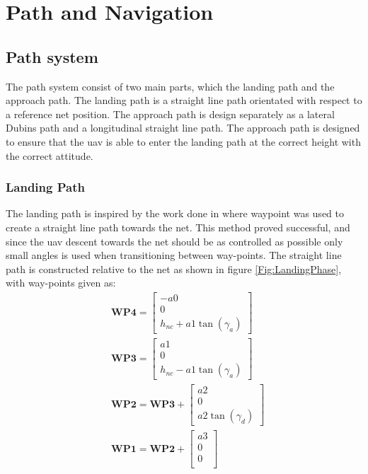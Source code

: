 \chapter{Path and Navigation}
\section{Path system}\label{Ch:LandingPath}
The path system consist of two main parts, which the landing path and the approach path. The landing path is a straight line path orientated with respect to a reference net position. The approach path is design separately as a lateral Dubins path and a longitudinal straight line path. The approach path is designed to ensure that the \gls{uav} is able to enter the landing path at the correct height with the correct attitude.
\subsection{Landing Path}\label{SS:netApproach}
The landing path is inspired by the work done in \citep{Skulstad&Syversen} where waypoint was used to create a straight line path towards the net. This method proved successful, and since the \gls{uav} descent towards the net should be as controlled as possible only small angles is used when transitioning between way-points. The straight line path is constructed relative to the net as shown in figure \ref{Fig:LandingPhase}, with way-points given as:
\begin{subequations}
\begin{align}
&\mathbf{WP4} = 
\begin{bmatrix}
-a0 \\
0 \\
h_{nc} + a1\tan(\gamma_a) 
\end{bmatrix}\\
&\mathbf{WP3} = 
\begin{bmatrix}
a1 \\
0 \\
h_{nc} - a1\tan(\gamma_a)
\end{bmatrix}\\
&\mathbf{WP2} = \mathbf{WP3} + 
\begin{bmatrix}
a2 \\
0 \\
a2\tan(\gamma_d)
\end{bmatrix}\\
&\mathbf{WP1} = \mathbf{WP2} + 
\begin{bmatrix}
a3 \\
0 \\
0 \\
\end{bmatrix}
\end{align}
\end{subequations}
